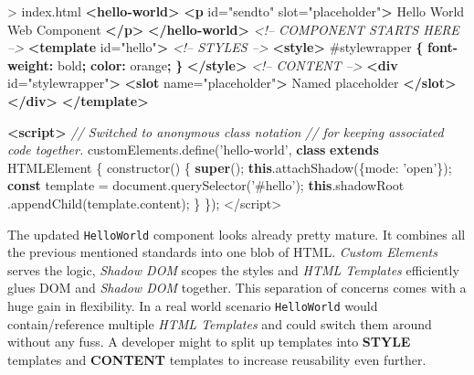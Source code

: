 \documentclass[]{assets/latex/ieee}
\newenvironment{Shaded}{}{}
\newcommand{\KeywordTok}[1]{\textcolor[rgb]{0.00,0.44,0.13}{\textbf{{#1}}}}
\newcommand{\DataTypeTok}[1]{\textcolor[rgb]{0.56,0.13,0.00}{{#1}}}
\newcommand{\FloatTok}[1]{\textcolor[rgb]{0.25,0.63,0.44}{{#1}}}
\newcommand{\StringTok}[1]{\textcolor[rgb]{0.25,0.44,0.63}{{#1}}}
\newcommand{\SpecialStringTok}[1]{\textcolor[rgb]{0.73,0.40,0.53}{{#1}}}
\newcommand{\CommentTok}[1]{\textcolor[rgb]{0.38,0.63,0.69}{\textit{{#1}}}}
\newcommand{\OtherTok}[1]{\textcolor[rgb]{0.00,0.44,0.13}{{#1}}}
\newcommand{\VariableTok}[1]{\textcolor[rgb]{0.10,0.09,0.49}{{#1}}}
\newcommand{\OperatorTok}[1]{\textcolor[rgb]{0.40,0.40,0.40}{{#1}}}
\newcommand{\AttributeTok}[1]{\textcolor[rgb]{0.49,0.56,0.16}{{#1}}}
\newcommand{\NormalTok}[1]{{#1}}
\begin{document}
\begin{Shaded}
\begin{Highlighting}[]
\NormalTok{> index.html}
\KeywordTok{<hello-world>}
 \KeywordTok{<p}\OtherTok{ id=}\StringTok{"sendto"}\OtherTok{ slot=}\StringTok{"placeholder"}\KeywordTok{>}
  \NormalTok{Hello World Web Component  }
 \KeywordTok{</p>}
\KeywordTok{</hello-world>}
\CommentTok{<!-- COMPONENT STARTS HERE -->}
\KeywordTok{<template}\OtherTok{ id=}\StringTok{"hello"}\KeywordTok{>}
 \CommentTok{<!-- STYLES -->}
 \KeywordTok{<style>}
  \FloatTok{#stylewrapper} \KeywordTok{\{}
   \KeywordTok{font-weight:} \DataTypeTok{bold}\KeywordTok{;}
   \KeywordTok{color:} \NormalTok{orange}\KeywordTok{;}
  \KeywordTok{\}}
 \KeywordTok{</style>}
 \CommentTok{<!-- CONTENT -->}
 \KeywordTok{<div}\OtherTok{ id=}\StringTok{"stylewrapper"}\KeywordTok{>}
  \KeywordTok{<slot}\OtherTok{ name=}\StringTok{"placeholder"}\KeywordTok{>}
   \NormalTok{Named placeholder}
  \KeywordTok{</slot>}
 \KeywordTok{</div>}
\KeywordTok{</template>}

\KeywordTok{<script>}
 \CommentTok{// Switched to anonymous class notation}
 \CommentTok{// for keeping associated code together.}
 \VariableTok{customElements}\NormalTok{.}\AttributeTok{define}\NormalTok{(}\StringTok{'hello-world'}\OperatorTok{,}
  \KeywordTok{class} \KeywordTok{extends} \NormalTok{HTMLElement }\OperatorTok{\{}
   \AttributeTok{constructor}\NormalTok{() }\OperatorTok{\{}
      \KeywordTok{super}\NormalTok{()}\OperatorTok{;}
    \KeywordTok{this}\NormalTok{.}\AttributeTok{attachShadow}\NormalTok{(}\OperatorTok{\{}\DataTypeTok{mode}\OperatorTok{:} \StringTok{'open'}\OperatorTok{\}}\NormalTok{)}\OperatorTok{;}
    \KeywordTok{const} \NormalTok{template }\OperatorTok{=}
     \VariableTok{document}\NormalTok{.}\AttributeTok{querySelector}\NormalTok{(}\StringTok{'#hello'}\NormalTok{)}\OperatorTok{;}
    \KeywordTok{this}\NormalTok{.}\AttributeTok{shadowRoot}
     \NormalTok{.}\AttributeTok{appendChild}\NormalTok{(}\VariableTok{template}\NormalTok{.}\AttributeTok{content}\NormalTok{)}\OperatorTok{;}
   \OperatorTok{\}}
  \OperatorTok{\}}\NormalTok{)}\OperatorTok{;}
\OperatorTok{<}\SpecialStringTok{/script>}
\end{Highlighting}
\end{Shaded}

The updated \texttt{HelloWorld} component looks already pretty mature.
It combines all the previous mentioned standards into one blob of HTML.
\emph{Custom Elements} serves the logic, \emph{Shadow DOM} scopes the
styles and \emph{HTML Templates} efficiently glues DOM and \emph{Shadow
DOM} together. This separation of concerns comes with a huge gain in
flexibility. In a real world scenario \texttt{HelloWorld} would
contain/reference multiple \emph{HTML Templates} and could switch them
around without any fuss. A developer might to split up templates into
\textbf{STYLE} templates and \textbf{CONTENT} templates to increase
reusability even further.
\end{document}
